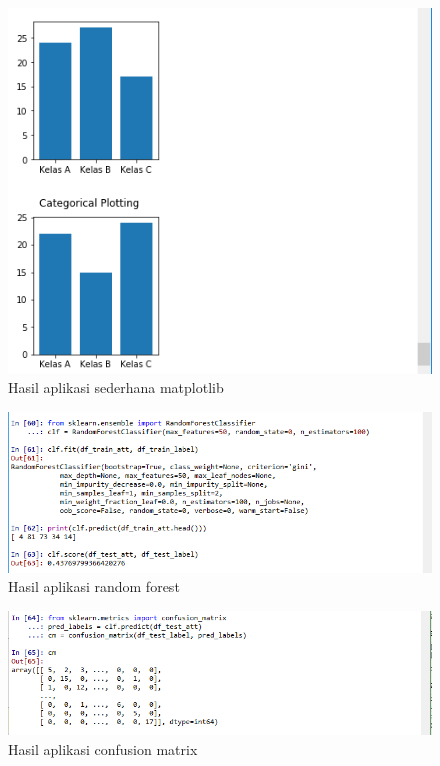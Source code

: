 \begin{figure}
      \centerline{\includegraphics[width=1\textwidth]
      {figures/cokro/c43}}
      \caption{Hasil aplikasi sederhana matplotlib}
      \label{c43}
      \end{figure}

\begin{figure}
      \centerline{\includegraphics[width=1\textwidth]
      {figures/cokro/c44}}
      \caption{Hasil aplikasi random forest}
      \label{c44}
      \end{figure}

\begin{figure}
      \centerline{\includegraphics[width=1\textwidth]
      {figures/cokro/c45}}
      \caption{Hasil aplikasi confusion matrix}
      \label{c45}
      \end{figure}

